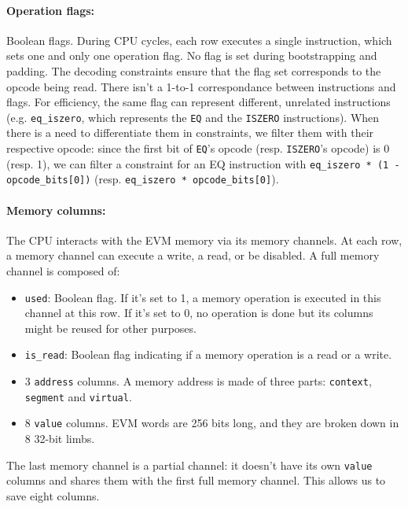 \paragraph*{Operation flags:} Boolean flags. During CPU cycles, each row executes a single instruction, which sets one and only one operation flag. No flag is set during
bootstrapping and padding. The decoding constraints ensure that the flag set corresponds to the opcode being read.
There isn't a 1-to-1 correspondance between instructions and flags. For efficiency, the same flag can represent different, unrelated instructions (e.g. \texttt{eq\_iszero}, which represents
the \texttt{EQ} and the \texttt{ISZERO} instructions). When there is a need to differentiate them in constraints, we filter them with their respective opcode: since the first bit of \texttt{EQ}'s opcode
(resp. \texttt{ISZERO}'s opcode) is 0 (resp. 1), we can filter a constraint for an EQ instruction with \texttt{eq\_iszero * (1 - opcode\_bits[0])}
(resp. \texttt{eq\_iszero * opcode\_bits[0]}).

\paragraph*{Memory columns:} The CPU interacts with the EVM memory via its memory channels. At each row, a memory channel can execute a write, a read, or be disabled. A full memory channel is composed of:
\begin{itemize}
    \item  \texttt{used}: Boolean flag. If it's set to 1, a memory operation is executed in this channel at this row. If it's set to 0, no operation is done but its columns might be reused for other purposes.
    \item  \texttt{is\_read}: Boolean flag indicating if a memory operation is a read or a write.
    \item  3 \texttt{address} columns. A memory address is made of three parts: \texttt{context}, \texttt{segment} and \texttt{virtual}.
    \item  8 \texttt{value} columns. EVM words are 256 bits long, and they are broken down in 8 32-bit limbs.
\end{itemize}
The last memory channel is a partial channel: it doesn't have its own \texttt{value} columns and shares them with the first full memory channel. This allows us to save eight columns.

